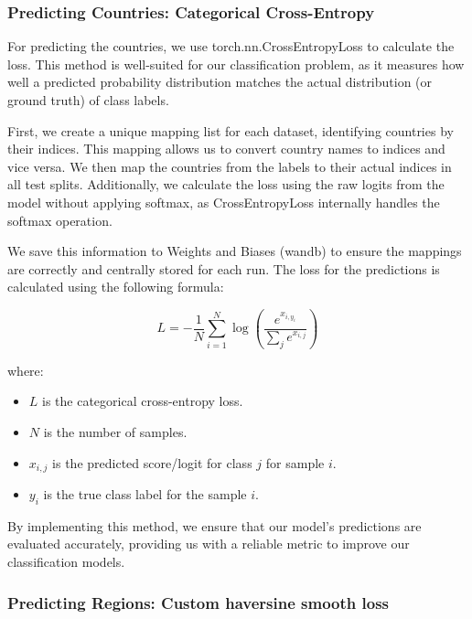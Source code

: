 \subsubsection{Predicting Countries: Categorical
Cross-Entropy}\label{predicting-countries-categorical-cross-entropy}

For predicting the countries, we use torch.nn.CrossEntropyLoss to
calculate the loss. This method is well-suited for our classification
problem, as it measures how well a predicted probability distribution
matches the actual distribution (or ground truth) of class labels.

First, we create a unique mapping list for each dataset, identifying
countries by their indices. This mapping allows us to convert country
names to indices and vice versa. We then map the countries from the
labels to their actual indices in all test splits. Additionally, we
calculate the loss using the raw logits from the model without applying
softmax, as CrossEntropyLoss internally handles the softmax operation.

We save this information to Weights and Biases (wandb) to ensure the
mappings are correctly and centrally stored for each run. The loss for
the predictions is calculated using the following formula:

\[
L = -\frac{1}{N} \sum_{i=1}^{N} \log \left( \frac{e^{x_{i, y_i}}}{\sum_{j} e^{x_{i,j}}} \right)
\]

where:

\begin{itemize}
\tightlist
\item
  \(L\) is the categorical cross-entropy loss.
\item
  \(N\) is the number of samples.
\item
  \(x_{i,j}\) is the predicted score/logit for class \(j\) for sample
  \(i\).
\item
  \(y_i\) is the true class label for the sample \(i\).
\end{itemize}

By implementing this method, we ensure that our model's predictions are
evaluated accurately, providing us with a reliable metric to improve our
classification models.

\subsubsection{Predicting Regions: Custom haversine smooth
loss}\label{predicting-regions-custom-haversine-smooth-loss}


